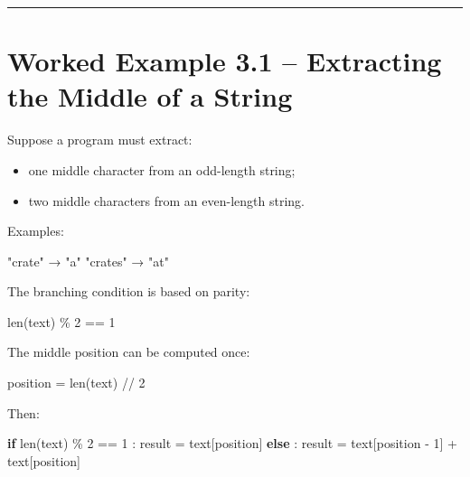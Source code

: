\documentclass[
  11pt,
  a4paper,
]{article}
\newenvironment{Shaded}{}{}
\newcommand{\BuiltInTok}[1]{\textcolor[rgb]{0.00,0.50,0.00}{#1}}
\newcommand{\ControlFlowTok}[1]{\textcolor[rgb]{0.00,0.44,0.13}{\textbf{#1}}}
\newcommand{\DecValTok}[1]{\textcolor[rgb]{0.25,0.63,0.44}{#1}}
\newcommand{\NormalTok}[1]{#1}
\newcommand{\OperatorTok}[1]{\textcolor[rgb]{0.40,0.40,0.40}{#1}}
\providecommand{\tightlist}{%
  \setlength{\itemsep}{0pt}\setlength{\parskip}{0pt}}
\begin{document}
\begin{center}\rule{0.5\linewidth}{0.5pt}\end{center}

\section{Worked Example 3.1 -- Extracting the Middle of a
String}\label{worked-example-3.1-extracting-the-middle-of-a-string}

Suppose a program must extract:

\begin{itemize}
\tightlist
\item
  one middle character from an odd-length string;
\item
  two middle characters from an even-length string.
\end{itemize}

Examples:

\begin{Shaded}
\begin{Highlighting}[]
\NormalTok{"crate"   → "a"}
\NormalTok{"crates"  → "at"}
\end{Highlighting}
\end{Shaded}

The branching condition is based on parity:

\begin{Shaded}
\begin{Highlighting}[]
\BuiltInTok{len}\NormalTok{(text) }\OperatorTok{\%} \DecValTok{2} \OperatorTok{==} \DecValTok{1}
\end{Highlighting}
\end{Shaded}

The middle position can be computed once:

\begin{Shaded}
\begin{Highlighting}[]
\NormalTok{position }\OperatorTok{=} \BuiltInTok{len}\NormalTok{(text) }\OperatorTok{//} \DecValTok{2}
\end{Highlighting}
\end{Shaded}

Then:

\begin{Shaded}
\begin{Highlighting}[]
\ControlFlowTok{if} \BuiltInTok{len}\NormalTok{(text) }\OperatorTok{\%} \DecValTok{2} \OperatorTok{==} \DecValTok{1}\NormalTok{ :}
\NormalTok{    result }\OperatorTok{=}\NormalTok{ text[position]}
\ControlFlowTok{else}\NormalTok{ :}
\NormalTok{    result }\OperatorTok{=}\NormalTok{ text[position }\OperatorTok{{-}} \DecValTok{1}\NormalTok{] }\OperatorTok{+}\NormalTok{ text[position]}
\end{Highlighting}
\end{Shaded}
\end{document}

